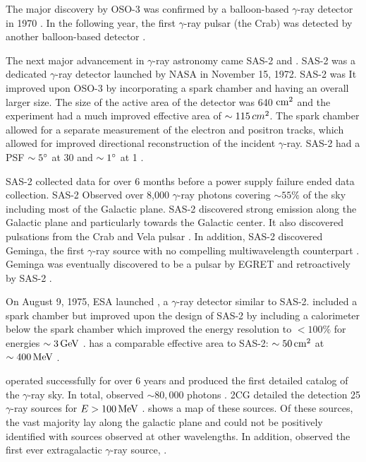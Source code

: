 The major discovery by \ac{OSO-3} was confirmed by a balloon-based
$\gamma$-ray detector in 1970  \citep{kniffen_1970_study-gamma}.  In the
following year, the first $\gamma$-ray pulsar (the Crab) was detected
by another balloon-based detector \cite{browning_1971_detection-pulsed}.

The next major advancement in $\gamma$-ray astronomy came
\ac{SAS-2} and \cosb.  \Ac{SAS-2} was a dedicated $\gamma$-ray
detector launched by \ac{NASA} in November 15, 1972.  \ac{SAS-2} was
\cite{fichtel_1975_high-energy-gamma-ray} It improved upon \ac{OSO-3}
by incorporating a spark chamber and having an overall larger size.
The size of the active area of the detector was 640 $\text{cm}^2$ and the
experiment had a much improved effective area of $\sim 115\,
cm^2$. The spark chamber allowed for a separate measurement of the
electron and positron tracks, which allowed for improved directional
reconstruction of the incident $\gamma$-ray. \Ac{SAS-2} had a PSF
$\sim5^\circ$ at 30 \mev and $\sim1^\circ$ at 1 \gev.

\Ac{SAS-2} collected data for over 6 months before a power supply failure
ended data collection. \Ac{SAS-2} Observed over 8,000 $\gamma$-ray photons
covering $\sim55\%$ of the sky including most of the Galactic plane.
\Ac{SAS-2} discovered strong emission along the Galactic plane and
particularly towards the Galactic center. It also discovered pulsations
from the Crab \citep{fichtel_1975_high-energy-gamma-ray} and Vela
pulsar \citep{thompson_1977_sas-2-high-energy}.  In addition, \ac{SAS-2}
discovered Geminga, the first $\gamma$-ray source with no compelling
multiwavelength counterpart \citep{thompson_1977_final-sas-2}. Geminga
was eventually discovered to be a pulsar by \ac{EGRET}
\citep{bertsch_1992_pulsed-high-energy} and retroactively by \ac{SAS-2}
\citep{mattox_1992_observation-pulsed}.

On August 9, 1975, \ac{ESA} launched \cosb, a $\gamma$-ray detector
similar to \ac{SAS-2}.  \cosb included a spark chamber but improved upon
the design of \ac{SAS-2} by including a calorimeter below the spark
chamber which improved the energy resolution to $<100\%$ for energies
$\sim 3\,\text{GeV}$ \citep{bignami_1975_cos-b-experiment}.  \cosb has
a comparable effective area to \ac{SAS-2}: $\sim 50\,\text{cm}^2$
at $\sim400\,\text{MeV}$ \citep{bignami_1975_cos-b-experiment}.

\cosb operated successfully for over 6 years and produced the first
detailed catalog of the $\gamma$-ray sky.  In total, \cosb observed $\sim
80,000$ photons \cite{mayer-hasselwander_1982_large-scale-distribution}.
\Ac{2CG} detailed the detection 25 $\gamma$-ray sources for
$E>100\,\text{MeV}$ \citep{swanenburg_1981_second-catalog}.
 shows a map of these sources.  Of these sources,
the vast majority lay along the galactic plane and could not be positively
identified with sources observed at other wavelengths.  In addition,
\cosb observed the first ever extragalactic $\gamma$-ray source,
\citep[3C273,][]{swanenburg_1978_observation-high-energy}.

